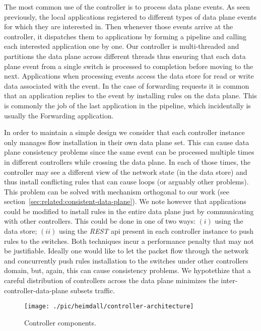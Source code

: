 The most common use of the controller is to process data plane events. As seen previously, the local applications registered to different types of data plane events for which they are interested in. Then whenever those events arrive at the controller, it dispatches them to applications by forming a pipeline and calling each interested application one by one. Our controller is multi-threaded and partitions the data plane across different threads thus ensuring  that each data plane event from a single switch is processed to completion before moving to the next. 
Applications when processing events access the data store for read or write data associated with the event. In the case of forwarding requests it is common that an application replies to the event by installing rules on the data plane. This is commonly the job of the last application in the pipeline, which incidentally is usually the Forwarding application.

In order to maintain a simple design we consider that each controller instance only manages flow installation in their own data plane set. 
This can cause data plane consistency problems since the same event can be processed multiple times in different controllers while crossing the data plane. In each of those times, the controller may see a different view of the network state (in the data store) and thus install conflicting rules that can cause loops (or arguably other problems). This problem can be solved with mechanism orthogonal to our work (see section~\ref{sec:related:consistent-data-plane}). We note however that applications could be modified to install rules in the entire data plane just by communicating with other controllers. This could be done in one of two ways: $(i)$ using the data store; $(ii)$ using the \emph{REST} \gls{api} present in each controller instance to push rules to the switches.  Both techniques incur a performance penalty that may not be justifiable. Ideally one would like to let the packet flow through the network and concurrently push rules installation to the switches under other controllers domain, but, again, this can cause consistency problems. 
We hypotethize that a careful distribution of controllers across the data plane minimizes the inter-controller-data-plane subsets traffic. 



\begin{figure}
  \centering
  \texttt{[image: ./pic/heimdall/controller-architecture]}
  \caption{Controller components. }
  \label{fig:heimdall:architecture}
\end{figure}



